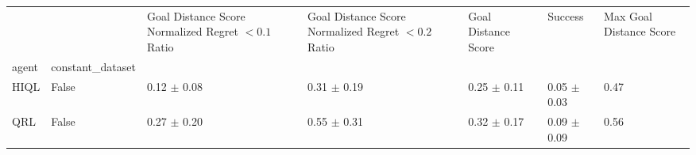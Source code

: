 \begin{tabular}{lllllll}
\toprule
 &  & Goal Distance Score Normalized Regret $< 0.1$ Ratio & Goal Distance Score Normalized Regret $< 0.2$ Ratio & Goal Distance Score & Success & Max Goal Distance Score \\
agent & constant_dataset &  &  &  &  &  \\
\midrule
HIQL & False & 0.12 $\pm$ 0.08 & 0.31 $\pm$ 0.19 & 0.25 $\pm$ 0.11 & 0.05 $\pm$ 0.03 & 0.47 \\
\cline{1-7}
QRL & False & 0.27 $\pm$ 0.20 & 0.55 $\pm$ 0.31 & 0.32 $\pm$ 0.17 & 0.09 $\pm$ 0.09 & 0.56 \\
\cline{1-7}
\bottomrule
\end{tabular}
